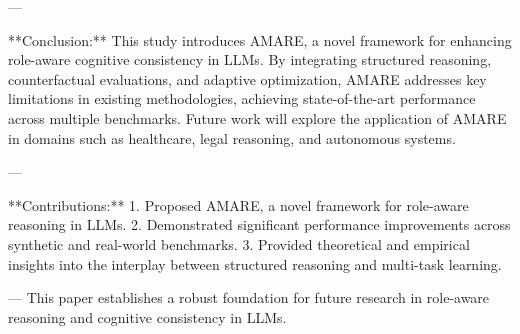 ---

**Conclusion:**  
This study introduces AMARE, a novel framework for enhancing role-aware cognitive consistency in LLMs. By integrating structured reasoning, counterfactual evaluations, and adaptive optimization, AMARE addresses key limitations in existing methodologies, achieving state-of-the-art performance across multiple benchmarks. Future work will explore the application of AMARE in domains such as healthcare, legal reasoning, and autonomous systems.

---

**Contributions:**  
1. Proposed AMARE, a novel framework for role-aware reasoning in LLMs.  
2. Demonstrated significant performance improvements across synthetic and real-world benchmarks.  
3. Provided theoretical and empirical insights into the interplay between structured reasoning and multi-task learning.  

---  
This paper establishes a robust foundation for future research in role-aware reasoning and cognitive consistency in LLMs.